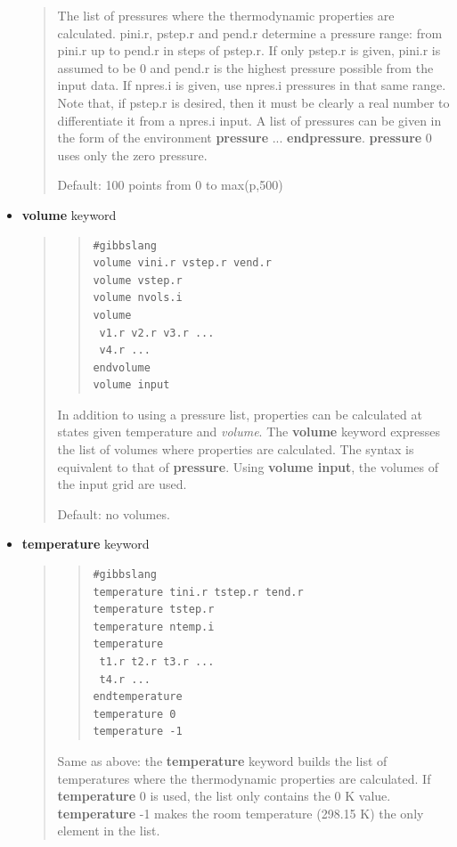 \documentclass[a4paper]{article}
\begin{document}
\begin{itemize}
\begin{quote}
The list of pressures where the thermodynamic properties are
calculated. pini.r, pstep.r and pend.r determine a pressure
range: from pini.r up to pend.r in steps of pstep.r. If only
pstep.r is given, pini.r is assumed to be 0 and pend.r is the
highest pressure possible from the input data. If npres.i is given,
use npres.i pressures in that same range. Note that, if pstep.r
is desired, then it must be clearly a real number to differentiate
it from a npres.i input. A list of pressures
can be given in the form of the environment \textbf{pressure}
... \textbf{endpressure}. \textbf{pressure} 0 uses only the zero pressure.

Default: 100 points from 0 to max(p,500)

\end{quote}

\item \textbf{volume} keyword
%
\begin{quote}
%
\begin{quote}
\begin{verbatim}
#gibbslang
volume vini.r vstep.r vend.r
volume vstep.r
volume nvols.i
volume
 v1.r v2.r v3.r ...
 v4.r ...
endvolume
volume input
\end{verbatim}
\end{quote}

In addition to using a pressure list, properties can be calculated
at states given temperature and \emph{volume}. The \textbf{volume} keyword
expresses the list of volumes where properties are calculated. The
syntax is equivalent to that of \textbf{pressure}. Using \textbf{volume
input}, the volumes of the input grid are used.

Default: no volumes.

\end{quote}

\item \textbf{temperature} keyword
%
\begin{quote}
%
\begin{quote}
\begin{verbatim}
#gibbslang
temperature tini.r tstep.r tend.r
temperature tstep.r
temperature ntemp.i
temperature
 t1.r t2.r t3.r ...
 t4.r ...
endtemperature
temperature 0
temperature -1
\end{verbatim}
\end{quote}

Same as above: the \textbf{temperature} keyword builds the list of
temperatures where the thermodynamic properties are calculated. If
\textbf{temperature} 0 is used, the list only contains the 0 K
value. \textbf{temperature} -1 makes the room temperature (298.15 K) the
only element in the list.


\end{quote}
\end{itemize}
\end{document}
